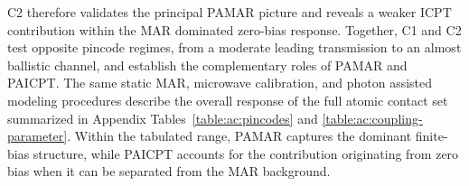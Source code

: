        C2 therefore validates the principal PAMAR picture and reveals a weaker ICPT contribution within the MAR dominated zero-bias response. Together, C1 and C2 test opposite pincode regimes, from a moderate leading transmission to an almost ballistic channel, and establish the complementary roles of PAMAR and PAICPT. The same static MAR, microwave calibration, and photon assisted modeling procedures describe the overall response of the full atomic contact set summarized in Appendix Tables~\ref{table:ac:pincodes} and \ref{table:ac:coupling-parameter}. Within the tabulated range, PAMAR captures the dominant finite-bias structure, while PAICPT accounts for the contribution originating from zero bias when it can be separated from the MAR background.
